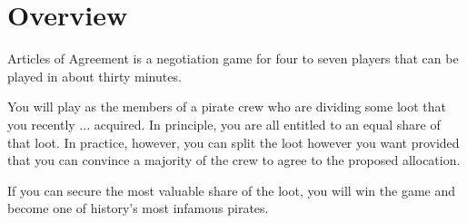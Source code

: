 \section*{Overview}
Articles of Agreement is a negotiation game for four to seven players that can be played in about thirty minutes.

You will play as the members of a pirate crew who are dividing some loot that you recently ... acquired.
In principle, you are all entitled to an equal share of that loot.
In practice, however, you can split the loot however you want \textendash{} provided that you can convince a majority of the crew to agree to the proposed allocation. 


If you can secure the most valuable share of the loot, you will win the game and become one of history's most infamous pirates.